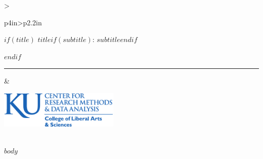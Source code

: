 \documentclass[$if(fontsize)$$fontsize$$endif$,english]{scrartcl}
\providecommand{\tabularnewline}{\\}
\begin{document}
\noindent \begin{center}
\begin{tabular}[t]{>{\raggedright}p{4in}>{\centering}p{2.2in}}
\hline 
\medskip{}

$if(title)$
\textsc{\huge{}$title$$if(subtitle)$: $subtitle$$endif$}{\huge \par}
$endif$

\noindent \rule[0.5ex]{1\linewidth}{1pt}

\medskip{}
  & \medskip{}


\includegraphics[width=2.25in]{theme/CRMDA_logo}\tabularnewline

\tabularnewline
\hline 
\end{tabular}
\par\end{center}

$body$
\end{document}
